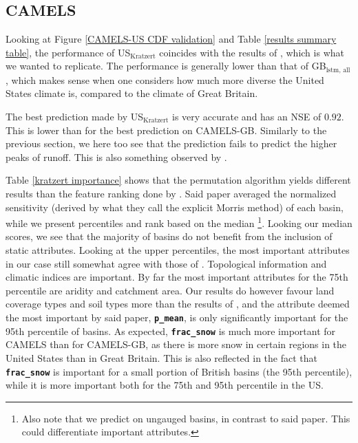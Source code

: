 \subsection{CAMELS}
Looking at Figure \ref{CAMELS-US CDF validation} and Table \ref{results summary table}, 
the performance of US$_\text{Kratzert}$ coincides with the results of \citet{lstm_third_paper}, 
which is what we wanted to replicate. The performance is generally lower than that 
of GB$_\text{lstm, all}$, which makes sense when one considers how much more diverse 
the United States climate is, compared to the climate of Great Britain. 

The best prediction made by US$_\text{Kratzert}$ is very accurate and has an NSE of $0.92$. 
This is lower than for the best prediction on CAMELS-GB. Similarly to the previous 
section, we here too
see that the prediction fails to predict the higher peaks of runoff. 
This is also something observed by \citet{lstm_first_paper}.

Table \ref{kratzert importance} shows that the permutation algorithm yields different 
results than the feature ranking done by \citet{lstm_second_paper}. Said paper 
averaged the normalized sensitivity (derived by what they call the explicit Morris 
method) of each basin, while we present percentiles and rank based on the median
\footnote{Also note that we predict on ungauged basins, in contrast to said paper. 
This could differentiate important attributes.}. 
Looking our median scores, we see that the majority of basins do not benefit 
from the inclusion of static attributes. Looking at the upper percentiles, the 
most important attributes in our case still somewhat agree with those of 
\citet{lstm_second_paper}. Topological information and climatic indices are important. 
By far the most important attributes for the 75th percentile are aridity and 
catchment area. Our results do however favour land coverage types and soil types 
more than the results of \citet{lstm_second_paper}, and the attribute deemed the most important by 
said paper, \textbf{\texttt{p\_mean}}, is only significantly important 
for the 95th percentile of basins. As expected, \textbf{\texttt{frac\_snow}} is 
much more important for CAMELS than for CAMELS-GB, as there is more snow 
in certain regions in the United States than in Great Britain. This is also reflected in the fact that 
\textbf{\texttt{frac\_snow}} is important for a small portion of British basins (the 95th percentile), 
while it is more important both for the 75th and 95th percentile in the US. 

